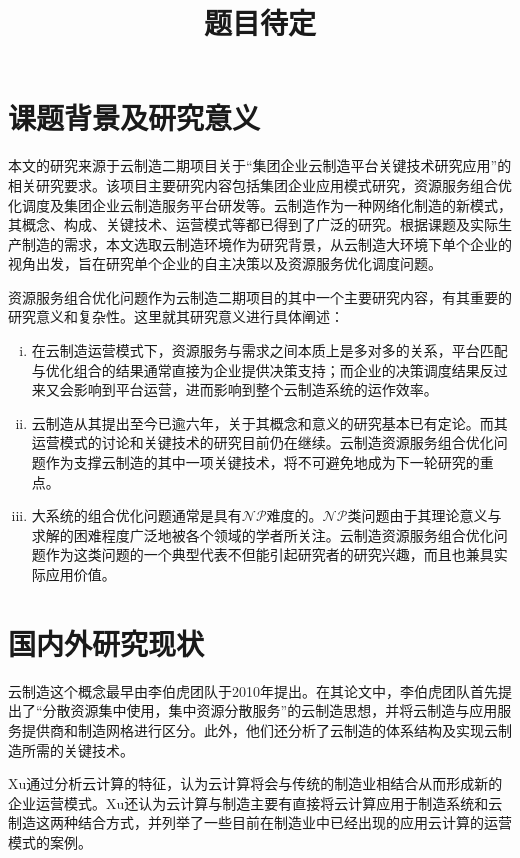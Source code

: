 \documentclass[UTF8]{ctexart}
\title{题目待定}
\begin{document}
\maketitle
\section{课题背景及研究意义}
\label{background}
本文的研究来源于云制造二期项目关于“集团企业云制造平台关键技术研究应用”的相关研究要求。该项目主要研究内容包括集团企业应用模式研究，资源服务组合优化调度及集团企业云制造服务平台研发等。云制造作为一种网络化制造的新模式，其概念、构成、关键技术、运营模式等都已得到了广泛的研究。根据课题及实际生产制造的需求，本文选取云制造环境作为研究背景，从云制造大环境下单个企业的视角出发，旨在研究单个企业的自主决策以及资源服务优化调度问题。

资源服务组合优化问题作为云制造二期项目的其中一个主要研究内容，有其重要的研究意义和复杂性。这里就其研究意义进行具体阐述：
\begin{enumerate}[(i)]
\item 在云制造运营模式下，资源服务与需求之间本质上是多对多的关系，平台匹配与优化组合的结果通常直接为企业提供决策支持；而企业的决策调度结果反过来又会影响到平台运营，进而影响到整个云制造系统的运作效率。
\item 云制造从其提出至今已逾六年，关于其概念和意义的研究基本已有定论。而其运营模式的讨论和关键技术的研究目前仍在继续。云制造资源服务组合优化问题作为支撑云制造的其中一项关键技术，将不可避免地成为下一轮研究的重点。
\item 大系统的组合优化问题通常是具有$\mathcal{NP}$难度的。$\mathcal{NP}$类问题由于其理论意义与求解的困难程度广泛地被各个领域的学者所关注。云制造资源服务组合优化问题作为这类问题的一个典型代表不但能引起研究者的研究兴趣，而且也兼具实际应用价值。
\end{enumerate}

\section{国内外研究现状}
\label{present research situation}
云制造这个概念最早由李伯虎团队\cite{LiBohu2010}于2010年提出。在其论文中，李伯虎团队首先提出了“分散资源集中使用，集中资源分散服务”的云制造思想，并将云制造与应用服务提供商和制造网格进行区分。此外，他们还分析了云制造的体系结构及实现云制造所需的关键技术。

Xu\cite{Xu2012}通过分析云计算的特征，认为云计算将会与传统的制造业相结合从而形成新的企业运营模式。Xu还认为云计算与制造主要有直接将云计算应用于制造系统和云制造这两种结合方式，并列举了一些目前在制造业中已经出现的应用云计算的运营模式的案例。
\end{document}
